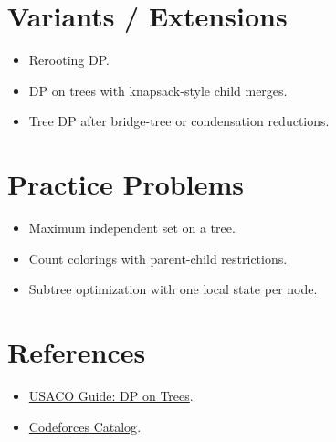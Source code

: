 \section*{Variants / Extensions}

\begin{itemize}
  \item Rerooting DP.
  \item DP on trees with knapsack-style child merges.
  \item Tree DP after bridge-tree or condensation reductions.
\end{itemize}

\section*{Practice Problems}

\begin{itemize}
  \item Maximum independent set on a tree.
  \item Count colorings with parent-child restrictions.
  \item Subtree optimization with one local state per node.
\end{itemize}

\section*{References}

\begin{itemize}
  \item \href{https://usaco.guide/gold/dp-trees}{USACO Guide: DP on Trees}.
  \item \href{https://codeforces.com/catalog}{Codeforces Catalog}.
\end{itemize}
